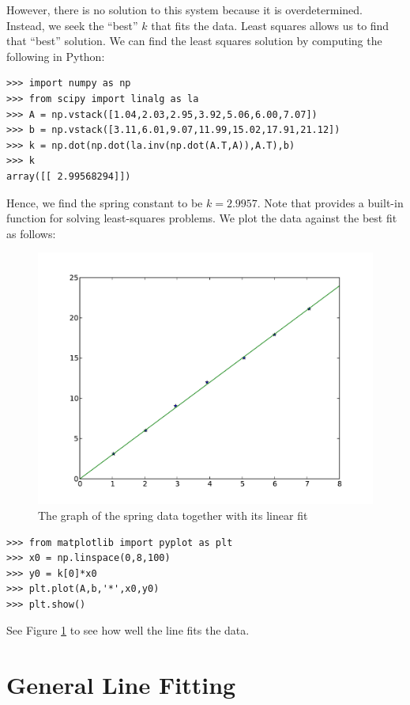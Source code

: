 However, there is no solution to this system because it is overdetermined.
Instead, we seek the ``best'' $k$ that fits the data.
Least squares allows us to find that ``best'' solution.
We can find the least squares solution by computing the following in Python:
\begin{lstlisting}
>>> import numpy as np
>>> from scipy import linalg as la
>>> A = np.vstack([1.04,2.03,2.95,3.92,5.06,6.00,7.07])
>>> b = np.vstack([3.11,6.01,9.07,11.99,15.02,17.91,21.12])
>>> k = np.dot(np.dot(la.inv(np.dot(A.T,A)),A.T),b)
>>> k
array([[ 2.99568294]])
\end{lstlisting}
Hence, we find the spring constant to be $k = 2.9957$.
Note that  provides a built-in function for solving
least-squares problems.
We plot the data against the best fit as follows:
\begin{figure}[h!]
\label{fig1}
\begin{center}
\includegraphics[width=\textwidth]{line_lstsq}
\caption{The graph of the spring data together with its linear fit}
\label{Fig:SpringFit}
\end{center}
\end{figure}

\begin{lstlisting}
>>> from matplotlib import pyplot as plt
>>> x0 = np.linspace(0,8,100)
>>> y0 = k[0]*x0
>>> plt.plot(A,b,'*',x0,y0)
>>> plt.show()
\end{lstlisting}
See Figure \ref{Fig:SpringFit} to see how well the line fits the data.


\section*{General Line Fitting}


